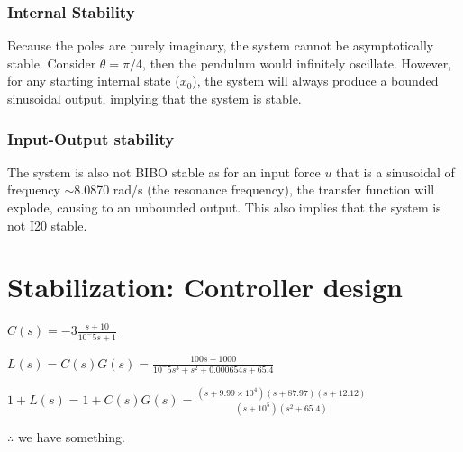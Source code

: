 \documentclass[10pt]{article}
\begin{document}
\subsubsection{Internal Stability}
Because the poles are purely imaginary, the system cannot be asymptotically stable. Consider $\theta = \pi/4$, then the pendulum would infinitely oscillate. However, for any starting internal state ($x_0$), the system will always produce a bounded sinusoidal output, implying that the system is stable. 


\subsubsection{Input-Output stability}
The system is also not BIBO stable as for an input force $u$ that is a sinusoidal of frequency $\sim$8.0870 rad/s (the resonance frequency), the transfer function will explode, causing to an unbounded output. This also implies that the system is not I20 stable.   
\section{Stabilization: Controller design}
\begin{math}
    C(s) = -3\frac{s+10}{10^-5s+1}
\end{math}

\begin{math}
L(s) = C(s)G(s) = \frac{100s + 1000}{10^-5s^3+s^2+0.000654s+65.4}
\end{math}

\begin{math}
1+L(s) = 1 + C(s)G(s) = \frac{(s + 9.99 \times 10^4)(s+87.97)(s+12.12)}{(s+10^5)(s^2+65.4)}
\end{math}



$\therefore$ we have something.
\mixedcls
\end{document}

